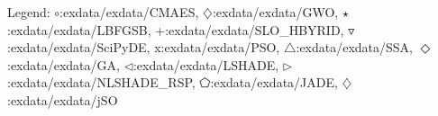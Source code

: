 Legend: {\color{CornflowerBlue}$\circ$}:exdata/exdata/CMAES, {{}$\diamondsuit$}:exdata/exdata/GWO, {\color{Green}$\star$}:exdata/exdata/LBFGSB, {\color{red}+}:exdata/exdata/SLO\_HBYRID, {\color{brown}$\triangledown$}:exdata/exdata/SciPyDE, {{}x}:exdata/exdata/PSO, {{}$\triangle$}:exdata/exdata/SSA, {{}$\Diamond$}:exdata/exdata/GA, {{}$\triangleleft$}:exdata/exdata/LSHADE, {{}$\triangleright$}:exdata/exdata/NLSHADE\_RSP, {{}$\pentagon$}:exdata/exdata/JADE, {{}$\diamondsuit$}:exdata/exdata/jSO